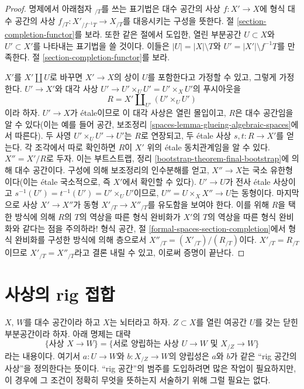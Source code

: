 \begin{proof}
명제에서 아래첨자 $ {}_{/T}$를 쓰는 표기법은 대수 공간의 사상
$f : X' \to X$에 형식 대수 공간의 사상
$f_{/T} : X'_{/f^{-1}T} \to X_{/T}$를 대응시키는 구성을 뜻한다.
절 \ref{section-completion-functor}를 보라.
또한 같은 절에서 도입한, 열린 부분공간
$U \subset X$와 $U' \subset X'$를 나타내는 표기법을 쓸 것이다.
이들은 $|U| = |X| \setminus T$와
$U' = |X'| \setminus f^{-1}T$를 만족한다. 절
\ref{section-completion-functor}를 보라.

\medskip\noindent
$X'$를 $X' \amalg U$로 바꾸면 $X' \to X$의 상이 $U$를 포함한다고
가정할 수 있고, 그렇게 가정한다.
$U' \to X'$와 대각 사상
$U' \to U' \times_U U' = U' \times_X U'$의 푸시아웃을
$$
R = X' \amalg_{U'} (U' \times_U U')
$$
이라 하자. $U' \to X$가 \'etale이므로 이 대각 사상은 열린 몰입이고,
$R$은 대수 공간임을 알 수 있다(이는 예를 들어 공간, 보조정리
\ref{spaces-lemma-glueing-algebraic-spaces}에서 따른다).
두 사영 $U' \times_U U' \to U'$는 $R$로 연장되고,
두 \'etale 사상 $s, t : R \to X'$를 얻는다.
각 조각에서 따로 확인하면 $R$이 $X'$ 위의 \'etale 동치관계임을 알 수 있다.
$X'' = X'/R$로 두자. 이는 부트스트랩, 정리
\ref{bootstrap-theorem-final-bootstrap}에 의해 대수 공간이다.
구성에 의해 보조정리의 인수분해를 얻고,
$X'' \to X$는 국소 유한형이다(이는 \'etale 국소적으로,
즉 $X'$에서 확인할 수 있다).
$U' \to U$가 전사 \'etale 사상이고
$s^{-1}(U') = t^{-1}(U') = U' \times_U U'$이므로,
$U'' = U \times_X X'' \to U$는 동형이다.
마지막으로 사상 $X' \to X''$가 동형
$X'_{/T} \to X''_{/T}$를 유도함을 보여야 한다.
이를 위해 $R$을 택한 방식에 의해 $R$의 $T$의 역상을 따른 형식 완비화가
$X'$의 $T$의 역상을 따른 형식 완비화와 같다는 점을 주의하라!
형식 공간, 절 \ref{formal-spaces-section-completion}에서 형식 완비화를
구성한 방식에 의해 층으로서
$X''_{/T} = (X'_{/T}) / (R_{/T})$이다.
$X'_{/T} = R_{/T}$이므로 $X'_{/T} = X''_{/T}$라고 결론 내릴 수 있고,
이로써 증명이 끝난다.
\end{proof}

\section{사상의 rig 접합}
\label{section-glue-formal-to-actual}

\noindent
$X$, $W$를 대수 공간이라 하고 $X$는 뇌터라고 하자.
$Z \subset X$를 열린 여공간 $U$를 갖는 닫힌 부분공간이라 하자.
아래 명제는 대략
$$
\{\text{사상 }X \to W\} =
\{\text{서로 양립하는 사상 }U \to W\text{ 및 }X_{/Z} \to W\}
$$
라는 내용이다. 여기서 $a : U \to W$와 $b : X_{/Z} \to W$의 양립성은
$a$와 $b$가 같은 “rig 공간의 사상”을 정의한다는 뜻이다.
“rig 공간”의 범주를 도입하려면 많은 작업이 필요하지만, 이 경우에
그 조건이 정확히 무엇을 뜻하는지 서술하기 위해 그럴 필요는 없다.

